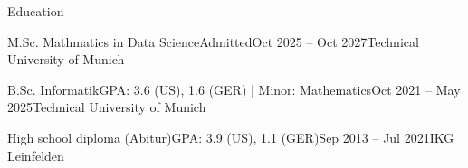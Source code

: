\documentclass{kyvernitis-resume}
\begin{document}
\resumeheader
{}
{}
{}
{}{}{}


\begin{section}{Education}
    \begin{subsectionnolist}{M.Sc. Mathmatics in Data Science}{Admitted}{Oct 2025 -- Oct 2027}{Technical University of Munich}
    \end{subsectionnolist}
    \begin{subsectionnolist}{B.Sc. Informatik}{GPA: 3.6 (US), 1.6 (GER) | Minor: Mathematics}{Oct 2021 -- May 2025}{Technical University of Munich}
    \end{subsectionnolist}

    
    \begin{subsectionnolist}{High school diploma (Abitur)}{GPA: 3.9 (US), 1.1 (GER)}{Sep 2013 -- Jul 2021}{IKG Leinfelden}
    \end{subsectionnolist}
\end{section}
\end{document}
